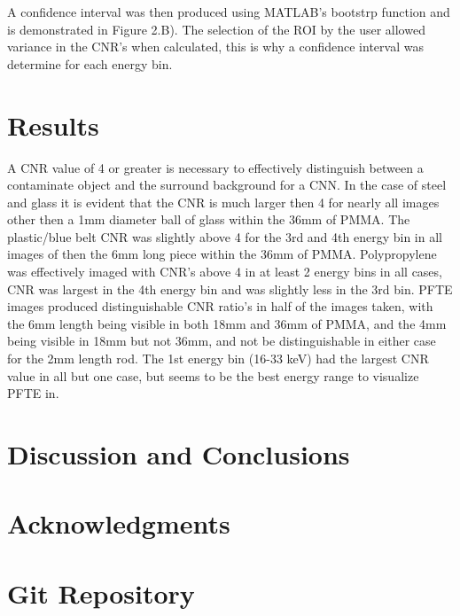 \documentclass[a4paper,11pt]{article}
\begin{document}
A confidence interval was then produced using MATLAB's bootstrp function and is demonstrated in Figure 2.B). The selection of the ROI by the user allowed variance in  the CNR's when calculated, this is why a confidence interval was determine for each energy bin. 

\section{Results}
A CNR value of 4 or greater is necessary to effectively distinguish between a contaminate object and the surround background for a CNN. In the case of steel and glass it is evident that the CNR is much larger then 4 for nearly all images other then a 1mm diameter ball of glass within the 36mm of PMMA. The plastic/blue belt CNR was slightly above 4 for the 3rd and 4th energy bin in all images of then the 6mm long piece within the 36mm of PMMA. Polypropylene was effectively imaged with CNR's above 4 in at least 2 energy bins in all cases, CNR was largest in the 4th energy bin and was slightly less in the 3rd bin. PFTE images produced distinguishable CNR ratio's in half of the images taken, with the 6mm length being visible in both 18mm and 36mm of PMMA, and the 4mm being visible in 18mm but not 36mm, and not be distinguishable in either case for the 2mm length rod. The 1st energy bin (16-33 keV) had the largest CNR value in all but one case, but seems to be the best energy range to visualize PFTE in. 

\section{Discussion and Conclusions}

 \section*{Acknowledgments}

\appendix{}
\section{Git Repository}








\vfill
\end{document}
